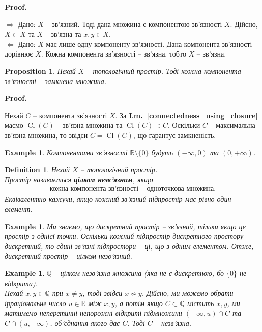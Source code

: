 \documentclass[a4paper, 10pt]{article}
\makeatletter
\def\rightproof{$\boxed{\Rightarrow}$ }
\def\leftproof{$\boxed{\Leftarrow}$ }
\theoremstyle{theoremdd}
\newtheorem{definition}[theorem]{Definition}
\newtheorem{example}[theorem]{Example}
\newtheorem{proposition}[theorem]{Proposition}
\newcommand\lmref[1]{\textbf{Lm.~\ref{#1}}}
\DeclareMathOperator{\Cl}{Cl}
\renewenvironment{proof}[1][Proof.\\]{\par
\pushQED{\hfill \qed}%
\normalfont \topsep6\p@\@plus6\p@\relax
\trivlist
\item\relax
{\bfseries
#1\@addpunct{.}}\hspace\labelsep\ignorespaces
}{%
\popQED\endtrivlist\@endpefalse
}
\makeatother
\begin{document}
\begin{proof}
\rightproof Дано: $X$ -- зв'язний. Тоді дана множина є компонентою зв'язності $X$. Дійсно, $X \subset X$ та $X$ -- зв'язна та $x,y \in X$.
\bigskip \\
\leftproof Дано: $X$ має лише одну компоненту зв'язності. Дана компонента зв'язності дорівнює $X$. Кожна компонента зв'язності -- зв'язна, тобто $X$ -- зв'язна.
\end{proof}

\begin{proposition}
Нехай $X$ -- топологічний простір. Тоді кожна компонента зв'язності -- замкнена множина.
\end{proposition}

\begin{proof}
Нехай $C$ -- компонента зв'язності $X$. За \lmref{connectedness_using_closure} маємо $\Cl(C)$ -- зв'язна множина та $\Cl(C) \supset C$. Оскільки $C$ -- максимальна зв'язна множина, то звідси $C = \Cl(C)$, що гарантує замкненість.
\end{proof}

\begin{example}
Компонентами зв'язності $\mathbb{R} \setminus \{0\}$ будуть $(-\infty,0)$ та $(0,+\infty)$.
\end{example}

\begin{definition}
Нехай $X$ -- топологічний простір.\\
Простір називається \textbf{цілком незв'язним}, якщо
\begin{align*}
\text{кожна компонента зв'язності -- одноточкова множина.}
\end{align*}
Еквівалентно кажучи, якщо кожний зв'язний підпростір має рівно один елемент.
\end{definition}

\begin{example}
Ми знаємо, що дискретний простір -- зв'язний, тільки якщо це простір з однієї точки. Оскільки кожний підпростір дискретного простору -- дискретний, то єдині зв'язні підпростори -- ці, що з одним елементом. Отже, дискретний простір -- цілком незв'язний.
\end{example}

\begin{example}
$\mathbb{Q}$ -- цілком незв'язна множина (яка не є дискретною, бо $\{0\}$ не відкрита).\\
Нехай $x,y \in \mathbb{Q}$ при $x \neq y$, тоді звідси $x \not\sim y$. Дійсно, ми можемо обрати ірраціональне число $u \in \mathbb{R}$ між $x,y$, а потім якщо $C \subset \mathbb{Q}$ містить $x,y$, ми матимемо неперетинні непорожні відкриті підмножини $(-\infty,u) \cap C$ та $C \cap (u,+\infty)$, об'єднання якого дає $C$. Тоді $C$ -- незв'язна.
\end{example}
\end{document}
